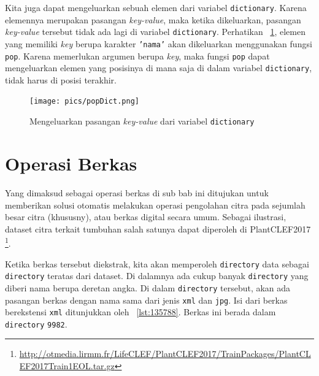 Kita juga dapat mengeluarkan sebuah elemen dari variabel \texttt{dictionary}. Karena elemennya merupakan pasangan \textit{key-value}, maka ketika dikeluarkan, pasangan \textit{key-value} tersebut tidak ada lagi di variabel \texttt{dictionary}. Perhatikan \figurename~\ref{fig:popDict}, elemen yang memiliki \textit{key} berupa karakter \texttt{'nama'} akan dikeluarkan menggunakan fungsi \texttt{pop}. Karena memerlukan argumen berupa \textit{key}, maka fungsi \texttt{pop} dapat mengeluarkan elemen yang posisinya di mana saja di dalam variabel \texttt{dictionary}, tidak harus di posisi terakhir.  

\begin{figure}[h!]
  \begin{center}
    \texttt{[image: pics/popDict.png]}
    \caption{Mengeluarkan pasangan \textit{key-value} dari variabel \texttt{dictionary}}
    \label{fig:popDict}
  \end{center}
\end{figure}

\section{Operasi Berkas}

Yang dimaksud sebagai operasi berkas di sub bab ini ditujukan untuk memberikan solusi otomatis melakukan operasi pengolahan citra pada sejumlah besar citra (khususny), atau berkas digital secara umum. Sebagai ilustrasi, dataset citra terkait tumbuhan salah satunya dapat diperoleh di PlantCLEF2017 \footnote{\url{http://otmedia.lirmm.fr/LifeCLEF/PlantCLEF2017/TrainPackages/PlantCLEF2017Train1EOL.tar.gz}}.

Ketika berkas tersebut diekstrak, kita akan memperoleh \texttt{directory} data sebagai \texttt{directory} teratas dari dataset. Di dalamnya ada cukup banyak \texttt{directory} yang diberi nama berupa deretan angka. Di dalam \texttt{directory} tersebut, akan ada pasangan berkas dengan nama sama dari jenis \texttt{xml} dan \texttt{jpg}. Isi dari berkas berekstensi \texttt{xml} ditunjukkan oleh \lstlistingname~\ref{lst:135788}. Berkas ini berada dalam \texttt{directory} \texttt{9982}.

\scriptsize

\normalsize

